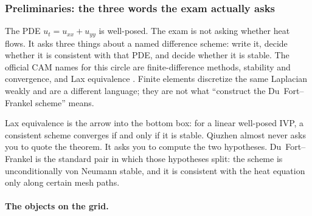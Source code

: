 \setcounter{section}{4}
\setcounter{theorem}{0}
\setcounter{definition}{0}
\setcounter{remark}{0}
\setcounter{note}{0}

\subsubsection{Preliminaries: the three words the exam actually asks}

The PDE \(u_t=u_{xx}+u_{yy}\) is well-posed. The exam is not asking whether heat flows. It asks three things about a named difference scheme: write it, decide whether it is consistent with that PDE, and decide whether it is stable. The official CAM names for this circle are finite-difference methods, stability and convergence, and Lax equivalence \cite{gko95,leveque07,strikwerda04,laxrichtmyer56}. Finite elements \cite{brennerscott10} discretize the same Laplacian weakly and are a different language; they are not what ``construct the Du~Fort--Frankel scheme'' means.

\begin{center}
\end{center}

Lax equivalence is the arrow into the bottom box: for a linear well-posed IVP, a consistent scheme converges if and only if it is stable. Qiuzhen almost never asks you to quote the theorem. It asks you to compute the two hypotheses. Du~Fort--Frankel is the standard pair in which those hypotheses split: the scheme is unconditionally von Neumann stable, and it is consistent with the heat equation only along certain mesh paths.

\paragraph{The objects on the grid.}

